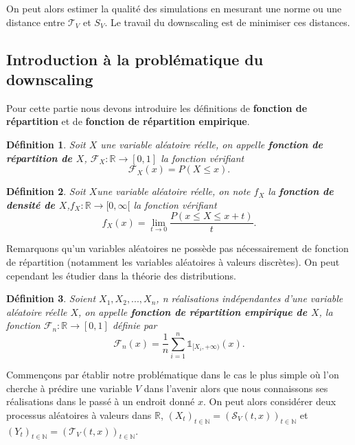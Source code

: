 \documentclass[a4paper,10pt]{article}
\newtheorem{definition}{Définition}
\begin{document}
On peut alors estimer la qualité des simulations en mesurant une norme ou une distance entre $\mathcal{T}_V$ et $S_V$. Le travail du downscaling est de minimiser ces distances.

\subsection{Introduction à la problématique du downscaling}
\label{intro-dwnsc}
Pour cette partie nous devons introduire les définitions de \textbf{fonction de répartition} et de \textbf{fonction de répartition empirique}.

\begin{definition}
	Soit $X$ une variable aléatoire réelle, on appelle \textbf{fonction de répartition de $X$}, $\mathcal{F}_{X}: \mathbb{R}\to [0,1]$ la fonction vérifiant
	\begin{equation}
		\mathcal{F}_{X}(x)=P(X\leq x).
	\end{equation}
\end{definition}

\begin{definition}
	Soit $X$une variable aléatoire réelle, on note $f_{X}$ la \textbf{fonction de densité de $X$},$f_{X}: \mathbb{R}\to [0,\infty[$ la fonction vérifiant
	\begin{equation}
		f_{X}(x)=\lim_{t\to 0} \frac{P(x\leq X \leq x+t)}{t}.
	\end{equation}
\end{definition}
Remarquons qu'un variables aléatoires ne possède pas nécessairement de fonction de répartition (notamment les variables aléatoires à valeurs discrètes). On peut cependant les étudier dans la théorie des distributions.

\begin{definition}
	Soient $X_1,X_2,...,X_n$, n réalisations indépendantes d'une variable aléatoire réelle $X$, on appelle \textbf{fonction de répartition empirique de $X$}, la fonction $\mathcal{F}_{n}:\mathbb{R}\to [0,1]$ définie par
	\begin{equation}
		\mathcal{F}_{n}(x)= \frac{1}{n}\sum_{i=1}^{n}\mathds{1}_{[X_i, +\infty )}(x).
	\end{equation}
	
\end{definition}

Commençons par établir notre problématique dans le cas le plus simple où l'on cherche à prédire une variable $V$ dans l'avenir alors que nous connaissons ses réalisations dans le passé à un endroit donné $x$.
On peut alors considérer deux processus aléatoires à valeurs dans $\mathbb{R}$, $(X_t)_{t \in \mathbb{N}}=(\mathcal{S}_{V}(t, x))_{t \in \mathbb{N}}$ et $(Y_t)_{t \in \mathbb{N}}=(\mathcal{T}_{V}(t, x))_{t \in \mathbb{N}}$.
\end{document}
